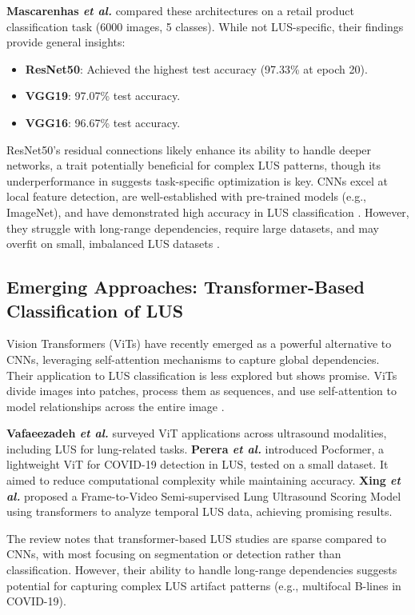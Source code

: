 \documentclass[12pt, a4paper]{article}
\begin{document}
\textbf{Mascarenhas \textit{et al.}} \cite{mascarenhas} compared these architectures on a retail product classification task (6000 images, 5 classes). While not LUS-specific, their findings provide general insights:
\begin{itemize}
  \item \textbf{ResNet50}: Achieved the highest test accuracy (97.33\% at epoch 20).
  \item \textbf{VGG19}: 97.07\% test accuracy.
  \item \textbf{VGG16}: 96.67\% test accuracy.
\end{itemize}
  ResNet50’s residual connections likely enhance its ability to handle deeper networks, a trait potentially beneficial for complex LUS patterns, though its underperformance in \cite{diaz} suggests task-specific optimization is key. CNNs excel at local feature detection, are well-established with pre-trained models (e.g., ImageNet), and have demonstrated high accuracy in LUS classification \cite{diaz}. However, they struggle with long-range dependencies, require large datasets, and may overfit on small, imbalanced LUS datasets \cite{vafaeezadeh}.

\subsection{Emerging Approaches: Transformer-Based Classification of LUS}

Vision Transformers (ViTs) have recently emerged as a powerful alternative to CNNs, leveraging self-attention mechanisms to capture global dependencies. Their application to LUS classification is less explored but shows promise. ViTs divide images into patches, process them as sequences, and use self-attention to model relationships across the entire image \cite{dosovitskiy}. 

\textbf{Vafaeezadeh \textit{et al.}} \cite{vafaeezadeh} surveyed ViT applications across ultrasound modalities, including LUS for lung-related tasks. 
\textbf{Perera \textit{et al.}} \cite{perera} introduced Pocformer, a lightweight ViT for COVID-19 detection in LUS, tested on a small dataset. It aimed to reduce computational complexity while maintaining accuracy.
\textbf{Xing \textit{et al.}} proposed a Frame-to-Video Semi-supervised Lung Ultrasound Scoring Model using transformers to analyze temporal LUS data, achieving promising results.

  The review notes that transformer-based LUS studies are sparse compared to CNNs, with most focusing on segmentation or detection rather than classification. However, their ability to handle long-range dependencies suggests potential for capturing complex LUS artifact patterns (e.g., multifocal B-lines in COVID-19).
\end{document}
